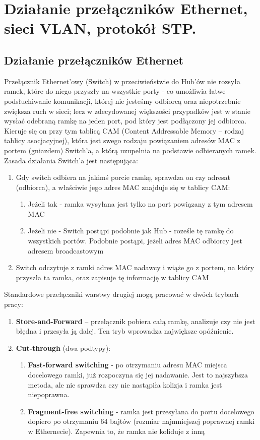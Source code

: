 \documentclass[main.tex]{subfiles}
\begin{document}
    \section{Działanie przełączników Ethernet, sieci VLAN, protokół STP.}
    \subsection{Działanie przełączników Ethernet}
    Przełącznik Ethernet'owy (Switch) w przeciwieństwie do Hub'ów nie rozsyła ramek, które do niego przyszły na wszystkie porty - co umożliwia łatwe podsłuchiwanie komunikacji,
    której nie jesteśmy odbiorcą oraz niepotrzebnie zwiększa ruch w sieci; lecz w zdecydowanej większości przypadków jest w stanie wysłać odebraną ramkę na jeden port,
    pod który jest podłączony jej odbiorca. Kieruje się on przy tym tablicą CAM (Content Addressable Memory – rodzaj tablicy asocjacyjnej), która jest swego rodzaju powiązaniem
    adresów MAC z portem (gniazdem) Switch'a, a którą uzupełnia na podstawie odbieranych ramek.
    Zasada działania Switch'a jest następująca:
    \begin{enumerate}
        \item Gdy switch odbiera na jakimś porcie ramkę, sprawdza on czy adresat (odbiorca), a właściwie jego adres MAC znajduje się w tablicy CAM:
        \begin{enumerate}
            \item Jeżeli tak - ramka wysyłana jest tylko na port powiązany z tym adresem MAC
            \item Jeżeli nie - Switch postąpi podobnie jak Hub - roześle tę ramkę do wszystkich portów. Podobnie postąpi, jeżeli adres MAC odbiorcy jest adresem broadcastowym
        \end{enumerate}
        \item Switch odczytuje z ramki adres MAC nadawcy i wiąże go z portem, na który przyszła ta ramka, oraz zapisuje tę informację w tablicy CAM
    \end{enumerate}

    \noindent Standardowe przełączniki warstwy drugiej mogą pracować w dwóch trybach pracy:
    \begin{enumerate}
        \item \textbf{Store-and-Forward} – przełącznik pobiera całą ramkę, analizuje czy nie jest błędna i przesyła ją dalej. Ten tryb wprowadza największe opóźnienie.
        \item \textbf{Cut-through} (dwa podtypy):
        \begin{enumerate}
            \item \textbf{Fast-forward switching} - po otrzymaniu adresu MAC miejsca docelowego ramki, już rozpoczyna się jej nadawanie.
            Jest to najszybsza metoda, ale nie sprawdza czy nie nastąpiła kolizja i ramka jest niepoprawna.
            \item \textbf{Fragment-free switching} - ramka jest przesyłana do portu docelowego dopiero po otrzymaniu 64 bajtów (rozmiar najmniejszej poprawnej ramki w Ethernecie).
            Zapewnia to, że ramka nie koliduje z inną
        \end{enumerate}
    \end{enumerate}
\end{document}
